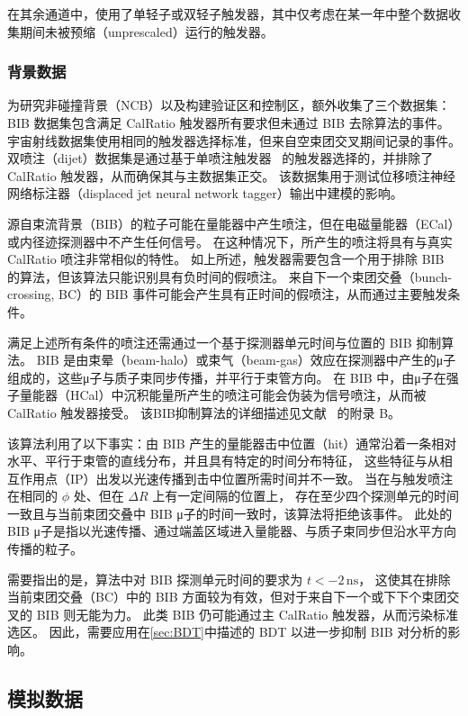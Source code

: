 在其余通道中，使用了单轻子或双轻子触发器，其中仅考虑在某一年中整个数据收集期间未被预缩（unprescaled）运行的触发器。


\subsubsection{背景数据}
为研究非碰撞背景（NCB）以及构建验证区和控制区，额外收集了三个数据集：
BIB 数据集包含满足 CalRatio 触发器所有要求但未通过 BIB 去除算法的事件。
宇宙射线数据集使用相同的触发器选择标准，但来自空束团交叉期间记录的事件。
双喷注（dijet）数据集是通过基于单喷注触发器~\cite{trigger} 的触发器选择的，并排除了 CalRatio 触发器，从而确保其与主数据集正交。
该数据集用于测试位移喷注神经网络标注器（displaced jet neural network tagger）输出中建模的影响。

源自束流背景（BIB）的粒子可能在量能器中产生喷注，但在电磁量能器（ECal）或内径迹探测器中不产生任何信号。
在这种情况下，所产生的喷注将具有与真实 CalRatio 喷注非常相似的特性。
如上所述，触发器需要包含一个用于排除 BIB 的算法，但该算法只能识别具有负时间的假喷注。
来自下一个束团交叠（bunch-crossing, BC）的 BIB 事件可能会产生具有正时间的假喷注，从而通过主要触发条件。

满足上述所有条件的喷注还需通过一个基于探测器单元时间与位置的 BIB 抑制算法。
BIB 是由束晕（beam-halo）或束气（beam-gas）效应在探测器中产生的μ子组成的，这些μ子与质子束同步传播，并平行于束管方向。
在 BIB 中，由μ子在强子量能器（HCal）中沉积能量所产生的喷注可能会伪装为信号喷注，从而被 CalRatio 触发器接受。
该BIB抑制算法的详细描述见文献~\cite{ATLAS-CONF-2016-103} 的附录 B。

该算法利用了以下事实：由 BIB 产生的量能器击中位置（hit）通常沿着一条相对水平、平行于束管的直线分布，并且具有特定的时间分布特征，
这些特征与从相互作用点（IP）出发以光速传播到击中位置所需时间并不一致。
当在与触发喷注在相同的 $\phi$ 处、但在 $\Delta R$ 上有一定间隔的位置上，
存在至少四个探测单元的时间一致且与当前束团交叠中 BIB μ子的时间一致时，该算法将拒绝该事件。
此处的 BIB μ子是指以光速传播、通过端盖区域进入量能器、与质子束同步但沿水平方向传播的粒子。

需要指出的是，算法中对 BIB 探测单元时间的要求为 $t < -2\,\mathrm{ns}$，
这使其在排除当前束团交叠（BC）中的 BIB 方面较为有效，但对于来自下一个或下下个束团交叉的 BIB 则无能为力。
此类 BIB 仍可能通过主 CalRatio 触发器，从而污染标准选区。
因此，需要应用在\autoref{sec:BDT}中描述的 BDT 以进一步抑制 BIB 对分析的影响。


\subsection{模拟数据}
\label{sec:MC}

